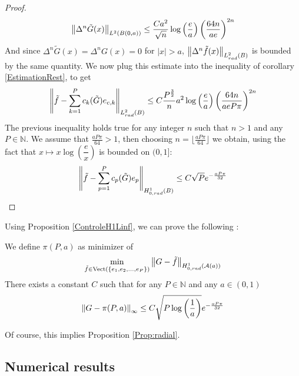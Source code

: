 \documentclass[11pt,a4paper]{article}
\begin{document}
\begin{The}
\begin{proof}
\[ \left\|\Delta^n \tilde{G}(x)\right\|_{L^2(B(0,a))} \leq \dfrac{C a^2}{\sqrt{n}}\log\left(\frac{e}{a}\right)\left( \frac{64n}{ae}\right)^{2n}\]
And since $\Delta^n \tilde{G}(x) = \Delta^n G(x) = 0$ for $|x|>a$, $\left\|\Delta^n \tilde{f}(x)\right\|_{L^2_{rad}(B)}$ is bounded by the same quantity. 
We now plug this estimate into the inequality of corollary \ref{EstimationRest}, to get
\[ \left\|\tilde{f} - \sum_{k=1}^{P}c_k(\tilde{G})e_{c,k}\right\|_{L^2_{rad}(B)} \leq C \dfrac{P^\frac{3}{2}}{n} a^2 \log\left(\dfrac{e}{a}\right)\left( \frac{64 n}{ae P \pi}\right)^{2n}\] 
The previous inequality holds true for any integer $n$ such that $n>1$ and any $P \in \mathbb{N}$. We assume that $\frac{aP\pi}{64} >1$, then choosing $n = \lfloor \frac{aP\pi}{64}\rfloor $ we obtain, using the fact that $x\mapsto x \log\left(\dfrac{e}{x}\right)$ is bounded on $(0,1]$:
\[ \left\|\tilde{f} - \sum_{p=1}^{P}c_p(\tilde{G})e_p\right\|_{H^1_{0,rad}(B)} \leq C \sqrt{P} e^{-\frac{aP\pi}{32}}\]
\end{proof}
\label{TheLaplace}
\end{The}

Using Proposition \ref{ControleH1Linf}, we can prove the following : 
\begin{Cor} We define $\pi(P,a)$ as minimizer of 
\[\min_{\tilde{f} \in \textup{Vect}\left(\{e_1,e_2,...,e_P\}\right)}\left\|G - \tilde{f}\right\|_{H^1_{0,rad}(\mathcal{A}(a))}\] 
There exists a constant $C$ such that for any $P\in \mathbb{N}$ and any $a\in(0,1)$
\[ \left\|G - \pi(P,a)\right\|_{\infty} \leq C\sqrt{P \log\left(\frac{1}{a}\right)} e^{-\frac{aP\pi}{32}}\]
\end{Cor}
Of course, this implies Proposition \ref{Prop:radial}. 

\subsection{Numerical results}
\end{document}
